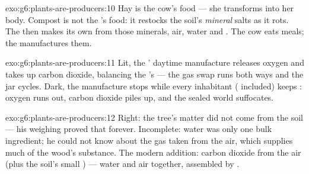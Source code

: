 \begin{solution}{exo:g6:plants-are-producers:10}
Hay is the cow's food ---  she transforms into
her body. Compost is not the 's food: it restocks the
soil's \emph{mineral} salts as it rots. The  then makes
its own  from those minerals, air, water and
. The cow eats meals; the  manufactures them.
\end{solution}

\begin{solution}{exo:g6:plants-are-producers:11}
Lit, the ' daytime manufacture releases oxygen and
takes up carbon dioxide, balancing the 's  ---
the gas swap runs both ways and the jar cycles. Dark, the
manufacture stops while every inhabitant ( included)
keeps : oxygen runs out, carbon dioxide piles up,
and the sealed world suffocates.
\end{solution}

\begin{solution}{exo:g6:plants-are-producers:12}
Right: the tree's matter did not come from the soil --- his
weighing proved that forever. Incomplete: water was only one
bulk ingredient; he could not know about the gas taken from
the air, which supplies much of the wood's substance. The
modern addition: carbon dioxide from the air (plus the
soil's small ) --- water and air together,
assembled by .
\end{solution}

